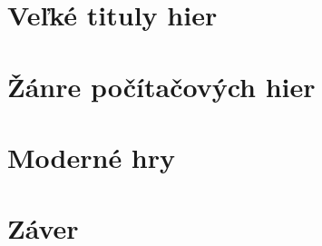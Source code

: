 \documentclass[10pt,oneside,slovak,a4paper]{article}
\begin{document}
\section{Veľké tituly hier} \label{tretia}

\section{Žánre počítačových hier} \label{stvrta}

\section{Moderné hry} \label{piata}

\section{Záver} \label{zaver} %



\end{document}
